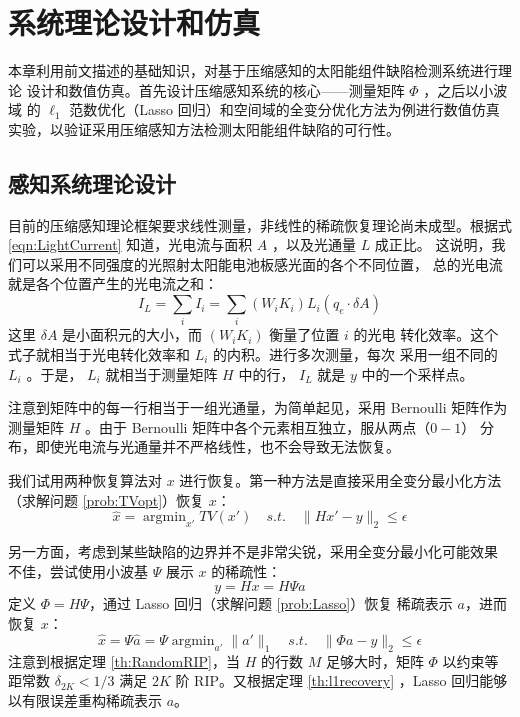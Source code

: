 \chapter{系统理论设计和仿真}

本章利用前文描述的基础知识，对基于压缩感知的太阳能组件缺陷检测系统进行理论
设计和数值仿真。首先设计压缩感知系统的核心——测量矩阵 $\Phi$ ，之后以小波域
的 $\ell_1$ 范数优化（Lasso 回归）和空间域的全变分优化方法为例进行数值仿真
实验，以验证采用压缩感知方法检测太阳能组件缺陷的可行性。

\section{感知系统理论设计}

目前的压缩感知理论框架要求线性测量，非线性的稀疏恢复理论尚未成型。根据式
\ref{eqn:LightCurrent} 知道，光电流与面积 $A$ ，以及光通量 $L$ 成正比。
这说明，我们可以采用不同强度的光照射太阳能电池板感光面的各个不同位置，
总的光电流就是各个位置产生的光电流之和：
\begin{equation}
I_L = \sum_i I_i = \sum_i (W_i K_i)  L_i(q_e \cdot \delta A)
\end{equation}
这里 $\delta A$ 是小面积元的大小，而 $(W_i K_i)$ 衡量了位置 $i$ 的光电
转化效率。这个式子就相当于光电转化效率和 $L_i$ 的内积。进行多次测量，每次
采用一组不同的 $L_i$ 。于是， $L_i$ 就相当于测量矩阵 $H$ 中的行，
$I_L$ 就是 $y$ 中的一个采样点。

注意到矩阵中的每一行相当于一组光通量，为简单起见，采用 Bernoulli 矩阵作为
测量矩阵 $H$ 。由于 Bernoulli 矩阵中各个元素相互独立，服从两点（$0-1$）
分布，即使光电流与光通量并不严格线性，也不会导致无法恢复。

我们试用两种恢复算法对 $x$ 进行恢复。第一种方法是直接采用全变分最小化方法
（求解问题 \ref{prob:TVopt}）恢复 $x$：
\begin{equation}
\hat x = \mathop{\arg\min}_{x'} TV(x') \quad s.t. \quad
\|Hx' - y\|_2 \leq \epsilon
\end{equation}

另一方面，考虑到某些缺陷的边界并不是非常尖锐，采用全变分最小化可能效果
不佳，尝试使用小波基 $\Psi$ 展示 $x$ 的稀疏性：
\begin{equation}
y = Hx = H\Psi a
\end{equation}
定义 $\Phi = H\Psi$，通过 Lasso 回归（求解问题 \ref{prob:Lasso}）恢复
稀疏表示 $a$，进而恢复 $x$：
\begin{equation}
\hat x = \Psi \hat a = \Psi \mathop{\arg\min}_{a'} \|a'\|_1 \quad s.t.
\quad \|\Phi a - y\|_2 \leq \epsilon
\end{equation}
注意到根据定理 \ref{th:RandomRIP}，当 $H$ 的行数 $M$ 足够大时，矩阵 $\Phi$
以约束等距常数 $\delta_{2K} < 1/3$ 满足 $2K$ 阶 RIP。又根据定理
\ref{th:l1recovery} ，Lasso 回归能够以有限误差重构稀疏表示 $a$。

